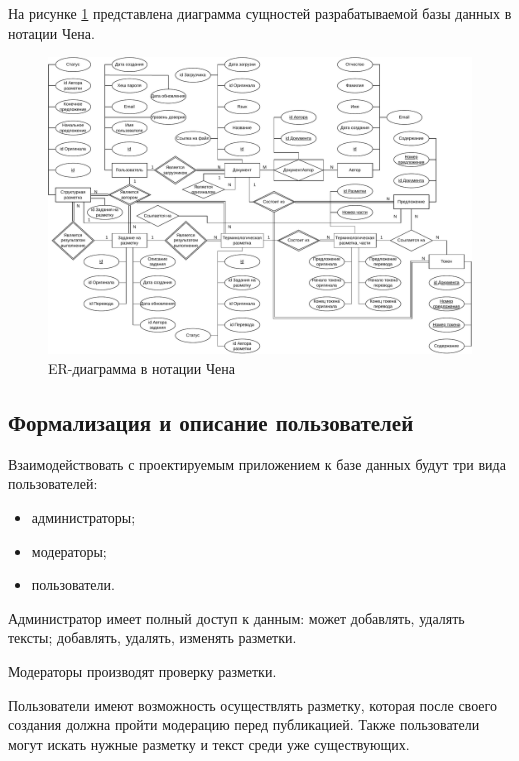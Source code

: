 

На рисунке \ref{fig:chen} представлена диаграмма сущностей разрабатываемой базы данных в нотации Чена.

\begin{figure}[H]
	\centering
	\includegraphics[angle=90, width=\textwidth]{diag/chen-v9.pdf}
	\caption{ER-диаграмма в нотации Чена}
	\label{fig:chen}
\end{figure}

\subsection{Формализация и описание пользователей}

Взаимодействовать с проектируемым приложением к базе данных будут три вида пользователей:
\begin{itemize}
    \item администраторы;
    \item модераторы;
    \item пользователи.
\end{itemize}

Администратор имеет полный доступ к данным: может добавлять, удалять тексты; добавлять, удалять, изменять разметки.

Модераторы производят проверку разметки.

Пользователи имеют возможность осуществлять разметку, которая после своего создания должна пройти модерацию перед публикацией.
Также пользователи могут искать нужные разметку и текст среди уже существующих.


